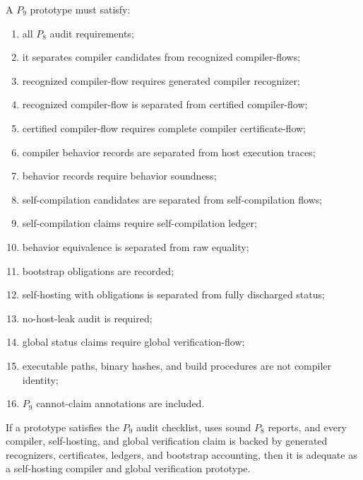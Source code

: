 \begin{definition}
\label{def:self-hosting-p9-audit}
A $P_9$ prototype must satisfy:
\begin{enumerate}
\item all $P_8$ audit requirements;
\item it separates compiler candidates from recognized compiler-flows;
\item recognized compiler-flow requires generated compiler recognizer;
\item recognized compiler-flow is separated from certified compiler-flow;
\item certified compiler-flow requires complete compiler certificate-flow;
\item compiler behavior records are separated from host execution traces;
\item behavior records require behavior soundness;
\item self-compilation candidates are separated from self-compilation flows;
\item self-compilation claims require self-compilation ledger;
\item behavior equivalence is separated from raw equality;
\item bootstrap obligations are recorded;
\item self-hosting with obligations is separated from fully discharged status;
\item no-host-leak audit is required;
\item global status claims require global verification-flow;
\item executable paths, binary hashes, and build procedures are not compiler identity;
\item $P_9$ cannot-claim annotations are included.
\end{enumerate}
\end{definition}

\begin{theorem}
\label{thm:self-hosting-p9-adequacy}
If a prototype satisfies the $P_9$ audit checklist, uses sound $P_8$ reports, and every compiler, self-hosting, and global verification claim is backed by generated recognizers, certificates, ledgers, and bootstrap accounting, then it is adequate as a self-hosting compiler and global verification prototype.
\end{theorem}

